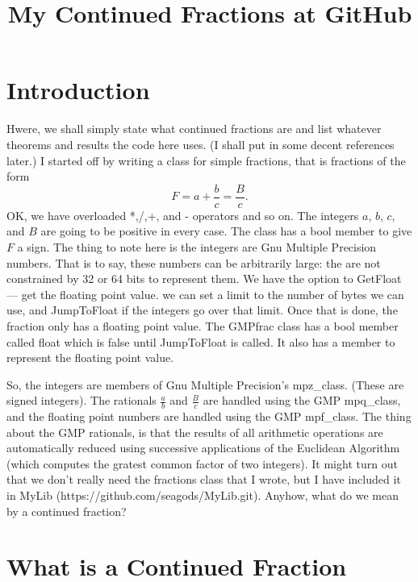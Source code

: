 \documentclass[12pt]{article}
\numberwithin{equation}{section}
\numberwithin{figure}{section}
\numberwithin{figure}{section}
\numberwithin{equation}{section}
\begin{document}
\thispagestyle{empty}

\title{My Continued Fractions at GitHub}

\maketitle

\tableofcontents

\section{Introduction}

Hwere, we shall simply state what continued fractions are and list whatever theorems and results
the code here uses. (I shall put in some decent references later.)
I started off by writing a class for simple fractions, that is fractions
of the form 
\begin{equation}
F=a+\frac{b}{c}=\frac{B}{c}.
\end{equation}
OK, we have overloaded *,/,+, and - operators and so on. The integers $a$, $b$, $c$, and $B$
 are going to be positive in every case. The class has a bool member to give $F$ a sign.
The thing to note here is the integers are Gnu Multiple Precision numbers. That is to say, these numbers
can be arbitrarily large: the are not constrained by 32 or 64 bits to represent them.
We have the option to GetFloat --- get the floating point value. we can set a limit to the number
 of bytes we can use, and JumpToFloat if the integers go over that limit. Once 
that is done, the fraction only has a floating point value. The GMPfrac class
has a bool member called float which is false until JumpToFloat is called. It also
has a member to represent the floating point value.

So, the integers are members of Gnu Multiple Precision's {mpz\_class}. (These are signed integers).
The rationals $\frac{a}{b}$  and $\frac{B}{c}$ are handled using the GMP {mpq\_class}, and the
floating point numbers are handled using the GMP {mpf\_class}. The thing about the GMP rationals, is
 that the results of all arithmetic operations are automatically reduced using successive applications
of  the Euclidean Algorithm (which computes the gratest common factor of two integers).
It might turn out that we don't really need the fractions class that I wrote, but I have included it
in MyLib (https://github.com/seagods/MyLib.git). Anyhow, what do we mean by a continued fraction?

\section{What is a Continued Fraction}
\end{document}
